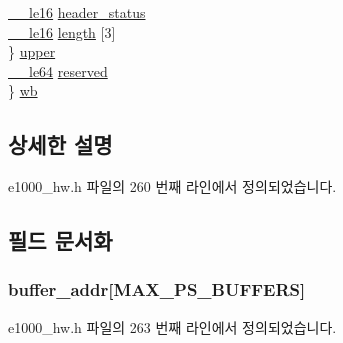 \begin{DoxyCompactItemize}
\begin{tabbing}
\>\>\hyperlink{lib_2igb_2e1000__osdep_8h_a42b303dec823d42e18116e091891a235}{\_\_le16} \hyperlink{unione1000__rx__desc__packet__split_a1460c1d96af1d321e9fb81995a5695bb}{header\_status}\\
\>\>\hyperlink{lib_2igb_2e1000__osdep_8h_a42b303dec823d42e18116e091891a235}{\_\_le16} \hyperlink{unione1000__rx__desc__packet__split_acd952f9a722b7efe7bd0cee47d7a7b8a}{length} \mbox{[}3\mbox{]}\\
\>\} \hyperlink{unione1000__rx__desc__packet__split_afb176da0b59274bd53e942aefe7c3a88}{upper}\\
\>\hyperlink{lib_2igb_2e1000__osdep_8h_a082a2c540152aca8c135a709aa7d228f}{\_\_le64} \hyperlink{unione1000__rx__desc__packet__split_a88d9c62ed30207dc583e0eac89f29298}{reserved}\\
\} \hyperlink{unione1000__rx__desc__packet__split_ab5e1aa7473d87b2cda1147771833c46a}{wb}\\

\end{tabbing}\end{DoxyCompactItemize}


\subsection{상세한 설명}


e1000\+\_\+hw.\+h 파일의 260 번째 라인에서 정의되었습니다.



\subsection{필드 문서화}
\subsubsection[{\texorpdfstring{buffer\+\_\+addr}{buffer_addr}}]{ buffer\+\_\+addr\mbox{[}{\bf M\+A\+X\+\_\+\+P\+S\+\_\+\+B\+U\+F\+F\+E\+RS}\mbox{]}}\hypertarget{unione1000__rx__desc__packet__split_ab9b8995544ff890be0e6f3ff23e2be16}{}\label{unione1000__rx__desc__packet__split_ab9b8995544ff890be0e6f3ff23e2be16}


e1000\+\_\+hw.\+h 파일의 263 번째 라인에서 정의되었습니다.

